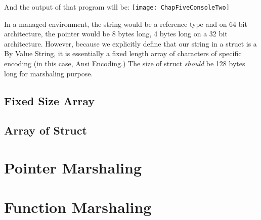 

And the output of that program will be:
\newline
\newline
\texttt{[image: ChapFiveConsoleTwo]}
\newpage

In a managed environment, the string would be a reference type and on 64 bit architecture, the pointer would be 8 bytes long, 4 bytes long on a 32 bit architecture. However, because we explicitly define that our string in a struct is a By Value String, it is essentially a fixed length array of characters of specific encoding (in this case, Ansi Encoding.) The size of struct \textit{should} be 128 bytes long for marshaling purpose.
\subsection{Fixed Size Array}

\subsection{Array of Struct}

\section{Pointer Marshaling}

\section{Function Marshaling}

